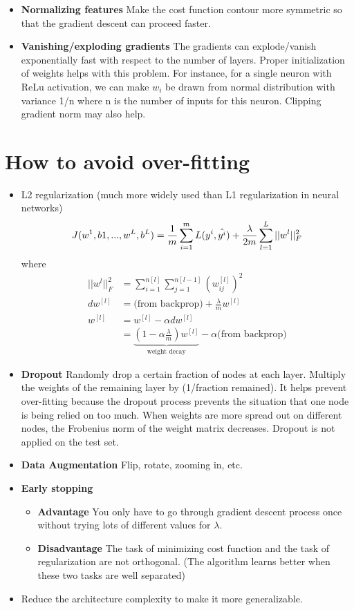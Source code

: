 \begin{itemize}
    \item \textbf{Normalizing features} Make the cost function contour more symmetric so that the gradient descent can proceed faster. 
    \item \textbf{Vanishing/exploding gradients} The gradients can explode/vanish exponentially fast with respect to the number of layers. Proper initialization of weights helps with this problem. For instance, for a single neuron with ReLu activation, we can make $w_i$ be drawn from normal distribution with variance 1/n where n is the number of inputs for this neuron. Clipping gradient norm may also help.

\end{itemize}


\section{How to avoid over-fitting}
    \begin{itemize}
        \item L2 regularization (much more widely used than L1 regularization in neural networks)
        $$
        J(w^{1}, b{1}, ..., w^L, b^L) = \frac{1}{m}\sum_{i=1}^m L(y^{i}, \Hat{y^{i}}) + \frac{\lambda}{2m}\sum_{l=1}^{L}||w^l||_{F}^2
        $$
        where
        \begin{align*}
        ||w^l||_{F}^2 &= \sum_{i=1}^{n[l]}\sum_{j=1}^{n[l-1]}(w^{[l]}_{ij})^2\\
        dw^{[l]} &= \text{(from backprop)} + \frac{\lambda}{m}w^{[l]}\\
        w^{[l]} &= w^{[l]} - \alpha dw^{[l]}\\
        &= \underbrace{(1-\alpha\frac{\lambda}{m})w^{[l]}}_{\text{weight decay}} -\alpha\text{(from backprop)}
        \end{align*}
        \item \textbf{Dropout} Randomly drop a certain fraction of nodes at each layer. Multiply the weights of the remaining layer by (1/fraction remained). It helps prevent over-fitting because the dropout process prevents the situation that one node is being relied on too much. When weights are more spread out on different nodes, the Frobenius norm of the weight matrix decreases. Dropout is not applied on the test set. 
        \item \textbf{Data Augmentation} Flip, rotate, zooming in, etc.
        \item \textbf{Early stopping} 
        \begin{itemize}
            \item \textbf{Advantage} You only have to go through gradient descent process once without trying lots of different values for $\lambda$.
            \item \textbf{Disadvantage} The task of minimizing cost function and the task of regularization are not orthogonal. (The algorithm learns better when these two tasks are well separated) 
        \end{itemize}
        \item Reduce the architecture complexity to make it more generalizable. 
    \end{itemize}
    


